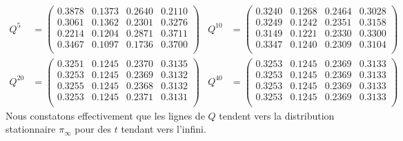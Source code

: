 \documentclass[a4paper, 12pt]{report}
\begin{document}
    \begin{align*}
        Q^{5} & =
        \begin{pmatrix}
	        \num{0.3878} & \num{0.1373} & \num{0.2640} & \num{0.2110} \\
	        \num{0.3061} & \num{0.1362} & \num{0.2301} & \num{0.3276} \\
	        \num{0.2214} & \num{0.1204} & \num{0.2871} & \num{0.3711} \\
	        \num{0.3467} & \num{0.1097} & \num{0.1736} & \num{0.3700} \\
	    \end{pmatrix}
	    &
        Q^{10} & =
        \begin{pmatrix}
	        \num{0.3240} & \num{0.1268} & \num{0.2464} & \num{0.3028} \\
	        \num{0.3249} & \num{0.1242} & \num{0.2351} & \num{0.3158} \\
	        \num{0.3149} & \num{0.1221} & \num{0.2330} & \num{0.3300} \\
	        \num{0.3347} & \num{0.1240} & \num{0.2309} & \num{0.3104} \\
	    \end{pmatrix}
	    \\
        Q^{20} & =
        \begin{pmatrix}
	        \num{0.3251} & \num{0.1245} & \num{0.2370} & \num{0.3135} \\
	        \num{0.3253} & \num{0.1245} & \num{0.2369} & \num{0.3132} \\
	        \num{0.3255} & \num{0.1245} & \num{0.2368} & \num{0.3132} \\
	        \num{0.3253} & \num{0.1245} & \num{0.2371} & \num{0.3131} \\
	    \end{pmatrix}
	    &
        Q^{40} & =
        \begin{pmatrix}
	        \num{0.3253} & \num{0.1245} & \num{0.2369} & \num{0.3133} \\
	        \num{0.3253} & \num{0.1245} & \num{0.2369} & \num{0.3133} \\
	        \num{0.3253} & \num{0.1245} & \num{0.2369} & \num{0.3133} \\
	        \num{0.3253} & \num{0.1245} & \num{0.2369} & \num{0.3133} \\
	    \end{pmatrix}
    \end{align*}
    Nous constatons effectivement que les lignes de $Q$ tendent vers la distribution stationnaire $\pi_\infty$ pour des $t$ tendant vers l’infini.
\end{document}
